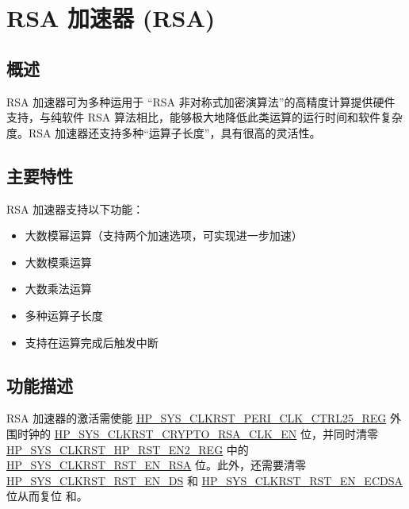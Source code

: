 \documentclass[main\_\_CN.tex]{subfiles}
\begin{document}

\ifglobal
\else
    {\let\clearpage\relax \listoftodos}
    {\let\clearpage\relax \listofdonetodos}
    \tableofcontents
\fi


\hypertarget{rsa}{}
\chapter{RSA 加速器 (RSA)}\label{mod:rsa}

\section{概述}

RSA 加速器可为多种运用于 “RSA 非对称式加密演算法”的高精度计算提供硬件支持，与纯软件 RSA 算法相比，能够极大地降低此类运算的运行时间和软件复杂度。RSA 加速器还支持多种“运算子长度”，具有很高的灵活性。

\section{主要特性}

RSA 加速器支持以下功能：
\begin{itemize}
    \item 大数模幂运算（支持两个加速选项，可实现进一步加速）
    \item 大数模乘运算
    \item 大数乘法运算
    \item 多种运算子长度
    \item 支持在运算完成后触发中断
\end{itemize}


\section{功能描述}\label{sec:rsa-func-desc}

RSA 加速器的激活需使能 \hyperref[regdesc:HPSYSCLKRSTPERICLKCTRL25REG]{HP\_SYS\_CLKRST\_PERI\_CLK\_CTRL25\_REG} 外围时钟的 \hyperref[fielddesc:HPSYSCLKRSTCRYPTORSACLKEN]{HP\_SYS\_CLKRST\_CRYPTO\_RSA\_CLK\_EN} 位，并同时清零 \hyperref[regdesc:HPSYSCLKRSTHPRSTEN2REG]{HP\_SYS\_CLKRST\_HP\_RST\_EN2\_REG} 中的 \hyperref[fielddesc:HPSYSCLKRSTRSTENRSA]{HP\_SYS\_CLKRST\_RST\_EN\_RSA} 位。此外，还需要清零 \hyperref[fielddesc:HPSYSCLKRSTRSTENDS]{HP\_SYS\_CLKRST\_RST\_EN\_DS} 和 \hyperref[fielddesc:HPSYSCLKRSTRSTENECDSA]{HP\_SYS\_CLKRST\_RST\_EN\_ECDSA} 位从而复位 和。
\end{document}
